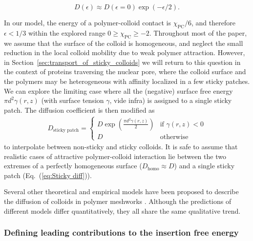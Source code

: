 \documentclass[12pt, a4paper]{article}
\begin{document}
\begin{equation}
    D(\epsilon)\approx D(\epsilon=0) \exp (-\epsilon / 2).
    \label{eq:Yamamoto}
\end{equation}

In our model, the energy of a polymer-colloid contact is $\chi_{\text{PC}}/6$, and therefore $\epsilon < 1/3$ within the explored range $0\geq\chi_{\text{PC}}\geq-2$.
Throughout most of the paper, we assume that the surface of the colloid is homogeneous, and neglect the small reduction in the local colloid mobility due to weak polymer attraction.
However, in Section~\ref{sec:transport_of_sticky_colloids} we will return to this question in the context of proteins traversing the nuclear pore, where the colloid surface and the polymers may be heterogeneous with affinity localized in a few sticky patches.
We can explore the limiting case where all the (negative) surface free energy $\pi d^2 \gamma(r,z)$ (with surface tension $\gamma$, vide infra) is assigned to a single sticky patch.
The diffusion coefficient is then modified as
\begin{eqnarray}
    D_{\text{sticky patch}} = 
    \begin{cases}
        D \exp(\frac{\pi d^2 \gamma(r,z)}{2}) & \text{if } \gamma(r,z) < 0 \\
        D & \text{otherwise}
    \end{cases}
     \label{eq:Sticky diff}
\end{eqnarray}
to interpolate between non-sticky and sticky colloids.
It is safe to assume that realistic cases of attractive polymer-colloid interaction lie between the two extremes of a perfectly homogeneous surface ($D_\text{homo} \approx D$) and a single sticky patch (Eq.~(\ref{eq:Sticky diff})).

Several other theoretical and empirical models have been proposed to describe the diffusion of colloids in polymer meshworks \cite{Schweizer2003,Kohli2012,Holyst2009,Phillies1988}.
Although the predictions of different models differ quantitatively, they all share the same qualitative trend.

\subsubsection{Defining leading contributions to the insertion free energy}
\end{document}
